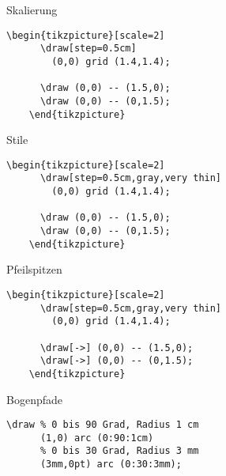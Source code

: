 \begin{Frame}[t,fragile]{Skalierung}

  \xxx

  \begin{lstlisting}[gobble=4]
    \begin{tikzpicture}[scale=2]
      \draw[step=0.5cm]
        (0,0) grid (1.4,1.4);

      \draw (0,0) -- (1.5,0);
      \draw (0,0) -- (0,1.5);
    \end{tikzpicture}
  \end{lstlisting}
\end{Frame}

\begin{Frame}[t,fragile]{Stile}

  \xxx

  \begin{lstlisting}[gobble=4]
    \begin{tikzpicture}[scale=2]
      \draw[step=0.5cm,gray,very thin]
        (0,0) grid (1.4,1.4);

      \draw (0,0) -- (1.5,0);
      \draw (0,0) -- (0,1.5);
    \end{tikzpicture}
  \end{lstlisting}
\end{Frame}

\begin{Frame}[t,fragile]{Pfeilspitzen}

  \xxx

  \begin{lstlisting}[gobble=4]
    \begin{tikzpicture}[scale=2]
      \draw[step=0.5cm,gray,very thin]
        (0,0) grid (1.4,1.4);

      \draw[->] (0,0) -- (1.5,0);
      \draw[->] (0,0) -- (0,1.5);
    \end{tikzpicture}
  \end{lstlisting}
\end{Frame}

\begin{Frame}[t,fragile]{Bogenpfade}

  \xxx

  \begin{lstlisting}[gobble=4]
    \draw % 0 bis 90 Grad, Radius 1 cm
      (1,0) arc (0:90:1cm)
      % 0 bis 30 Grad, Radius 3 mm
      (3mm,0pt) arc (0:30:3mm);
  \end{lstlisting}
\end{Frame}

